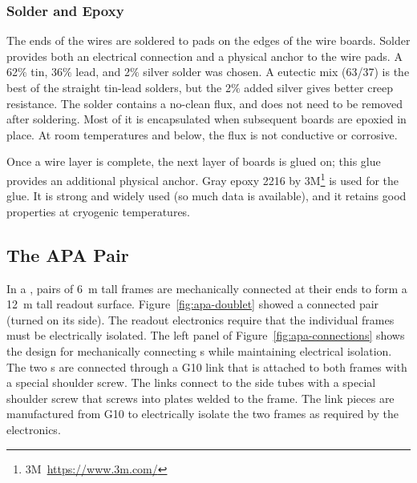 \subsubsection{Solder and Epoxy}
\label{sec:glue-solder}

The ends of the wires are soldered to pads on the edges of the wire boards.  Solder provides both an electrical connection and a physical anchor to the wire pads. A 62$\%$ tin, 36$\%$ lead, and 2$\%$ silver solder was chosen.  A eutectic mix (63/37) is the best of the straight tin-lead solders, but the 2$\%$ added silver gives better creep resistance.  The solder contains a no-clean flux, and does not need to be removed after soldering. Most of it is encapsulated when subsequent boards are epoxied in place.  At room temperatures and below, the flux is not conductive or corrosive.

Once a wire layer is complete, the next layer of boards is glued on; this glue provides an additional physical anchor. Gray epoxy \num{2216} by 3M\footnote{3M\texttrademark ~\url{https://www.3m.com/}} is used for the glue.  It is strong and widely used (so much data is available), and it retains good properties at cryogenic temperatures.  


\subsection{The APA Pair} %
\label{sec:fdsp-apa-intfc-apa}

In a  , pairs of \SI{6}{m} tall  frames are mechanically connected at their ends to form a \SI{12}{m} tall readout surface.  Figure~\ref{fig:apa-doublet} showed a connected pair (turned on its side).  The  readout electronics require that the individual  frames must be electrically isolated.   The left panel of Figure~\ref{fig:apa-connections} shows the design for mechanically connecting s while maintaining electrical isolation.  The two s are connected through a G10 link that is attached to both frames with a special shoulder screw.  The links connect to the side tubes with a special shoulder screw that screws into plates welded to the frame.  The link pieces are manufactured from G10 to electrically isolate the two frames as required by the  electronics.  

